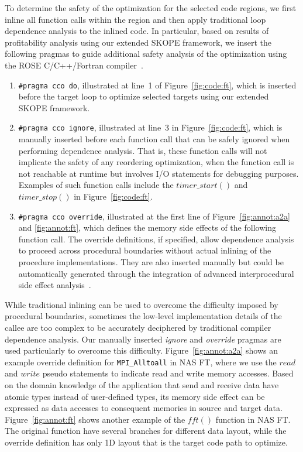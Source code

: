 To determine the safety of the optimization for the selected code
regions, we first inline all function calls within the region and then
apply traditional loop dependence analysis to the inlined code.  In
particular, based on results of profitability analysis using our
extended SKOPE framework, we insert the following pragmas to guide
additional safety analysis of the optimization using the ROSE
C/C++/Fortran compiler~\cite {ROSE}.

\begin{enumerate}

\item \texttt{\#pragma cco do}, illustrated at line~1 of
  Figure~\ref{fig:code:ft}, which is inserted before the target loop
  to optimize selected targets using our extended SKOPE framework.

\item \texttt{\#pragma cco ignore}, illustrated at line~3 in
  Figure~\ref{fig:code:ft}, which is manually inserted before each
  function call that can be safely ignored when performing dependence
  analysis. That is, these function calls will not implicate the
  safety of any reordering optimization, when the function call is not
  reachable at runtime but involves I/O statements for debugging
  purposes. Examples of such function calls include the
  $timer\_start()$ and $timer\_stop()$ in Figure~\ref{fig:code:ft}.

\item \texttt{\#pragma cco override}, illustrated at the first line of
  Figure~\ref{fig:annot:a2a} and \ref{fig:annot:ft}, which defines the
  memory side effects of the following function call.  The override
  definitions, if specified, allow dependence analysis to proceed
  across procedural boundaries without actual inlining of the
  procedure implementations. They are also inserted manually but could
  be automatically generated through the integration of advanced
  interprocedural side effect analysis~\cite{kennedy:cpld88}.

\end{enumerate}

While traditional inlining can be used to overcome the difficulty
imposed by procedural boundaries, sometimes the low-level
implementation details of the callee are too complex to be accurately
deciphered by traditional compiler dependence analysis. Our manually
inserted \emph{ignore} and \emph{override} pragmas are used
particularly to overcome this difficulty.  Figure~\ref{fig:annot:a2a}
shows an example override definition for \texttt{MPI\_Alltoall} in NAS
FT, where we use the $read$ and $write$ pseudo statements to indicate
read and write memory accesses.  Based on the domain knowledge of the
application that send and receive data have atomic types instead of
user-defined types, its memory side effect can be expressed as data
accesses to consequent memories in source and target data.
Figure~\ref{fig:annot:ft} shows another example of the $fft()$
function in NAS FT.  The original function have several branches for
different data layout, while the override definition has only 1D
layout that is the target code path to optimize.

